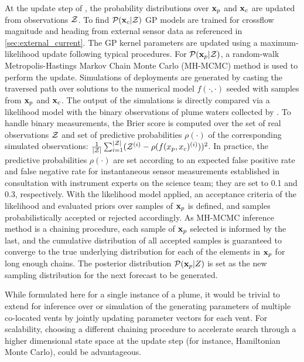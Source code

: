 At the update step of \PHUMES, the probability distributions over $\mathbf{x}_p$ and $\mathbf{x}_c$ are updated from observations $\mathcal{Z}$. To find $\mathcal{P}(\mathbf{x}_c|\mathcal{Z})$ GP models are trained for crossflow magnitude and heading from external sensor data as referenced in \cref{sec:external_current}. The GP kernel parameters are updated using a maximum-likelihood update following typical procedures\autocite{Rasmussen2004}. For $\mathcal{P}(\mathbf{x}_p | \mathcal{Z})$, a random-walk Metropolis-Hastings Markov Chain Monte Carlo (MH-MCMC) method\autocite{metropolis1953equation} is used to perform the update. Simulations of deployments are generated by casting the traversed path over solutions to the numerical model $f(\cdot, \cdot)$ seeded with samples from $\mathbf{x}_p$ and $\mathbf{x}_c$. The output of the simulations is directly compared via a likelihood model with the binary observations of plume waters collected by \Sentry. To handle binary measurements, the Brier score\autocite{brier1950verification} is computed over the set of real observations $\mathcal{Z}$ and set of predictive probabilities $\rho(\cdot)$ of the corresponding simulated observations: $\frac{1}{|\mathcal{Z}|}\sum_{i=1}^{|\mathcal{Z}|} (\mathcal{Z}^{(i)} - \rho(f(x_p, x_c)^{(i)}))^2$. In practice, the predictive probabilities $\rho(\cdot)$ are set according to an expected false positive rate and false negative rate for instantaneous sensor measurements established in consultation with instrument experts on the science team; they are set to 0.1 and 0.3, respectively. With the likelihood model applied, an acceptance criteria of the likelihood and evaluated priors over samples of $\mathbf{x}_p$ is defined, and samples probabilistically accepted or rejected accordingly. As MH-MCMC inference method is a chaining procedure, each sample of $\mathbf{x}_p$ selected is informed by the last, and the cumulative distribution of all accepted samples is guaranteed to converge to the true underlying distribution for each of the elements in $\mathbf{x}_p$ for long enough chains. The posterior distribution $\mathcal{P}(\mathbf{x}_p | Z)$ is set as the new sampling distribution for the next forecast to be generated.

While formulated here for a single instance of a plume, it would be trivial to extend \PHUMES for inference over or simulation of the generating parameters of multiple co-located vents by jointly updating parameter vectors for each vent. For scalability, choosing a different chaining procedure to accelerate search through a higher dimensional state space at the update step (for instance, Hamiltonian Monte Carlo\autocite{duane1987hybrid}), could be advantageous.


